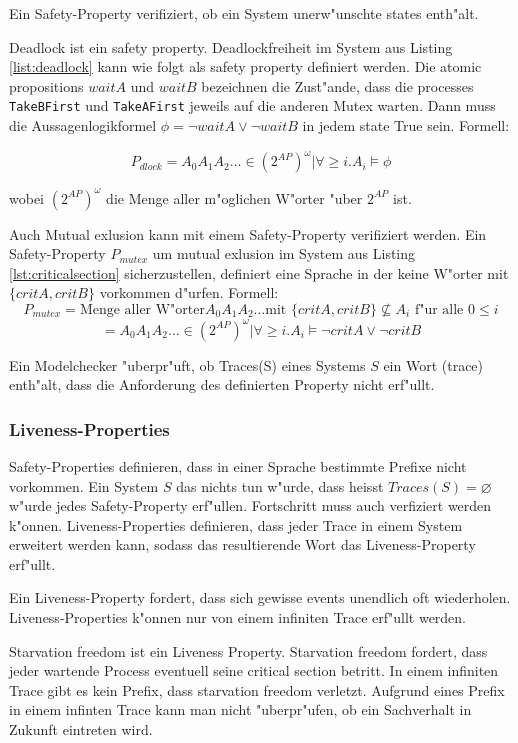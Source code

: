 \documentclass[a4paper, twoside]{article}
\begin{document}
Ein Safety-Property verifiziert, ob ein System unerw"unschte states enth"alt. 

Deadlock ist ein safety property. Deadlockfreiheit im System aus Listing \ref{list:deadlock} kann wie folgt als safety property definiert werden. Die atomic propositions $waitA$ und $waitB$ bezeichnen die Zust"ande, dass die processes \verb|TakeBFirst| und \verb|TakeAFirst| jeweils auf die anderen Mutex warten. Dann muss die Aussagenlogikformel  $\phi=\neg waitA \lor \neg waitB$ in jedem state True sein. Formell:

\[
P_{dlock} = {A_0 A_1 A_2 \dots \in (2^{AP})^{\omega} | \forall \geq i.   A_i \models \phi}
\]

wobei $(2^{AP})^{\omega}$ die Menge aller m"oglichen W"orter "uber $2^{AP}$ ist.

Auch Mutual exlusion kann mit einem Safety-Property verifiziert werden. Ein Safety-Property $P_{mutex}$ um mutual exlusion im System aus Listing \ref{lst:criticalsection} sicherzustellen, definiert eine Sprache in der keine W"orter mit $\{critA,critB\}$ vorkommen d"urfen. Formell:
\[
P_{mutex} = \text{Menge aller W"orter} A_0 A_1 A_2 \dots \text{mit } \{critA,critB\} \not \subseteq A_i \text{ f"ur alle } 0 \leq i
\]
\[
 = {A_0 A_1 A_2 \dots \in (2^{AP})^{\omega} | \forall \geq i.   A_i \models \neg critA \lor \neg critB}
\]

Ein Modelchecker "uberpr"uft, ob Traces(S) eines Systems $S$ ein Wort (trace) enth"alt, dass die Anforderung des definierten Property nicht erf"ullt.

\subsubsection{Liveness-Properties}
\label{sec:liveness}

Safety-Properties definieren, dass in einer Sprache bestimmte Prefixe nicht vorkommen. Ein System $S$ das nichts tun w"urde, dass heisst $Traces(S)=\varnothing$ w"urde jedes Safety-Property erf"ullen. Fortschritt muss auch verfiziert werden k"onnen. Liveness-Properties definieren, dass jeder Trace in einem System erweitert werden kann, sodass das resultierende Wort das Liveness-Property erf"ullt.

Ein Liveness-Property fordert, dass sich gewisse events unendlich oft wiederholen. Liveness-Properties k"onnen nur von einem infiniten Trace erf"ullt werden. 

Starvation freedom ist ein Liveness Property. Starvation freedom fordert, dass jeder wartende Process eventuell seine critical section betritt. In einem infiniten Trace gibt es kein Prefix, dass starvation freedom verletzt. Aufgrund eines Prefix in einem infinten Trace kann man nicht "uberpr"ufen, ob ein Sachverhalt in Zukunft eintreten wird.
\end{document}
